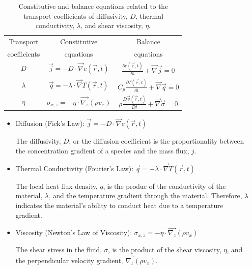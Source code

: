 \begin{table}[h]
\centering
\caption{Constitutive and balance equations related to the transport coefficients of diffusivity, $D$, thermal conductivity, $\lambda$, and shear viscosity, $\eta$.  
\label{tab:coeff}}
\renewcommand*{\arraystretch}{2}
\begin{tabular}{ ccc }
\toprule
Transport & Constitutive & Balance\\
coefficients& equations& equations\\
\hline
$D$ & $\vec{j} = -D \cdot \vec{\nabla}c(\vec{r},t)$ & $\frac{\partial c(\vec{r},t)}{\partial t}+\vec{\nabla}\vec{j}=0$ \\
$\lambda$ & $\vec{q} = -\lambda \cdot \vec{\nabla}T(\vec{r},t)$ & $C_p \frac{\partial T(\vec{r},t)}{\partial t}+\vec{\nabla}\vec{q}=0$ \\
$\eta$ & $\sigma_{x,z} = -\eta \cdot \vec{\nabla_{z}}(\rho v_x)$ & $\rho \frac{D\vec{v}(\vec{r}, t)}{Dt}+\vec{\nabla} \overset{\leftrightarrow}{\sigma}=0$\\
\bottomrule
\end{tabular}
\end{table}
\begin{itemize}
    \item Diffusion (Fick’s Law):
$\vec{j} = -D \cdot \vec{\nabla}c(\vec{r},t)$

The diffusivity, $D$, or the diffusion coefficient is the proportionality between the concentration gradient of a species and the mass flux, $j$. 

\item Thermal Conductivity (Fourier’s Law):
$\vec{q} = -\lambda \cdot \vec{\nabla}T(\vec{r},t)$

The local heat flux density, $q$, is the produc of the conductivity of the material, $\lambda$, and the temperature gradient through the material. Therefore, $\lambda$ indicates the material's ability to conduct heat due to a temperature gradient. 

\item Viscosity (Newton’s Law of Viscosity): 
$\sigma_{x,z} = -\eta \cdot \vec{\nabla_{z}}(\rho v_x)$

The shear stress in the fluid, $\sigma$, is the product of the shear viscosity, $\eta$, and the perpendicular velocity gradient, $\vec{\nabla_{z}}(\rho v_x)$.


\end{itemize}

